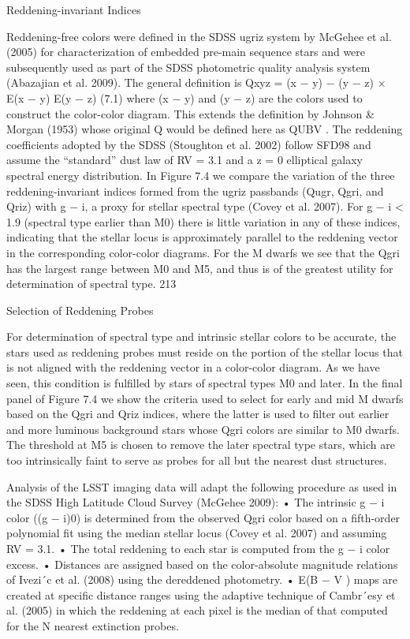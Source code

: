 Reddening-invariant Indices

Reddening-free colors were defined in the SDSS ugriz system by McGehee et al. (2005) for characterization
of embedded pre-main sequence stars and were subsequently used as part of the SDSS
photometric quality analysis system (Abazajian et al. 2009). The general definition is
Qxyz = (x − y) − (y − z) ×
E(x − y)
E(y − z)
(7.1)
where (x − y) and (y − z) are the colors used to construct the color-color diagram. This extends
the definition by Johnson & Morgan (1953) whose original Q would be defined here as QUBV . The
reddening coefficients adopted by the SDSS (Stoughton et al. 2002) follow SFD98 and assume the
“standard” dust law of RV = 3.1 and a z = 0 elliptical galaxy spectral energy distribution.
In Figure 7.4 we compare the variation of the three reddening-invariant indices formed from the
ugriz passbands (Qugr, Qgri, and Qriz) with g − i, a proxy for stellar spectral type (Covey et al.
2007). For g − i < 1.9 (spectral type earlier than M0) there is little variation in any of these
indices, indicating that the stellar locus is approximately parallel to the reddening vector in the
corresponding color-color diagrams. For the M dwarfs we see that the Qgri has the largest range
between M0 and M5, and thus is of the greatest utility for determination of spectral type.
213

Selection of Reddening Probes

For determination of spectral type and intrinsic stellar colors to be accurate, the stars used as
reddening probes must reside on the portion of the stellar locus that is not aligned with the
reddening vector in a color-color diagram. As we have seen, this condition is fulfilled by stars of
spectral types M0 and later. In the final panel of Figure 7.4 we show the criteria used to select
for early and mid M dwarfs based on the Qgri and Qriz indices, where the latter is used to filter
out earlier and more luminous background stars whose Qgri colors are similar to M0 dwarfs. The
threshold at M5 is chosen to remove the later spectral type stars, which are too intrinsically faint
to serve as probes for all but the nearest dust structures.

Analysis of the LSST imaging data will adapt the following procedure as used in the SDSS High
Latitude Cloud Survey (McGehee 2009):
• The intrinsic g − i color ((g − i)0) is determined from the observed Qgri color based on a
fifth-order polynomial fit using the median stellar locus (Covey et al. 2007) and assuming
RV = 3.1.
• The total reddening to each star is computed from the g − i color excess.
• Distances are assigned based on the color-absolute magnitude relations of Ivezi´c et al. (2008)
using the dereddened photometry.
• E(B − V ) maps are created at specific distance ranges using the adaptive technique of
Cambr´esy et al. (2005) in which the reddening at each pixel is the median of that computed
for the N nearest extinction probes.


